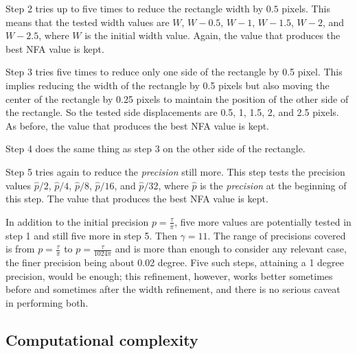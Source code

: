\documentclass{ipol}
\begin{document}
Step 2 tries up to five times to reduce the rectangle width by $0.5$
pixels. This means that the tested width values are $W$, $W-0.5$,
$W-1$, $W-1.5$, $W-2$, and $W-2.5$, where $W$ is the initial width
value. Again, the value that produces the best NFA value is kept.

Step 3 tries five times to reduce only one side of the rectangle by
0.5 pixel. This implies reducing the width of the rectangle by 0.5
pixels but also moving the center of the rectangle by 0.25 pixels to
maintain the position of the other side of the rectangle. So the
tested side displacements are 0.5, 1, 1.5, 2, and 2.5 pixels. As
before, the value that produces the best NFA value is kept.

Step 4 does the same thing as step 3 on the other side of the
rectangle.

Step 5 tries again to reduce the \emph{precision} still more. This
step tests the precision values $\hat{p}/2$, $\hat{p}/4$, $\hat{p}/8$,
$\hat{p}/16$, and $\hat{p}/32$, where $\hat{p}$ is
the \emph{precision} at the beginning of this step. The value that
produces the best NFA value is kept.

In addition to the initial precision $p=\frac{\tau}{\pi}$, five more
values are potentially tested in step 1 and still five more in step
5. Then $\gamma=11$. The range of precisions covered is from
$p=\frac{\tau}{\pi}$ to $p=\frac{\tau}{1024\pi}$ and is more than
enough to consider any relevant case, the finer precision being about
0.02 degree. Five such steps, attaining a 1 degree precision, would be
enough; this refinement, however, works better sometimes before and
sometimes after the width refinement, and there is no serious caveat
in performing both.


\subsection{Computational complexity}
\end{document}
